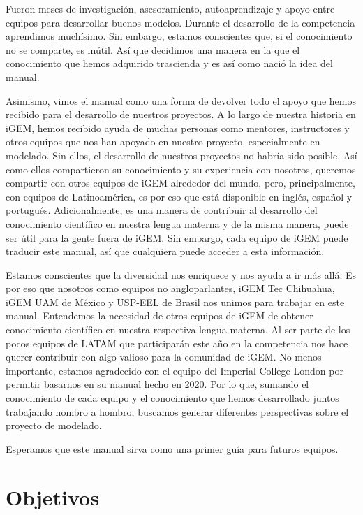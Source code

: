 \documentclass[11pt, letterpaper, spanish]{article}
\begin{document}
\par{Fueron meses de investigación, asesoramiento, autoaprendizaje y apoyo entre equipos para desarrollar buenos modelos. Durante el desarrollo de la competencia aprendimos muchísimo. Sin embargo, estamos conscientes que, si el conocimiento no se comparte, es inútil. Así que decidimos una manera en la que el conocimiento que hemos adquirido trascienda y es así como nació la idea del manual.}
\par{Asimismo, vimos el manual como una forma de devolver todo el apoyo que hemos recibido para el desarrollo de nuestros proyectos. A lo largo de nuestra historia en iGEM, hemos recibido ayuda de muchas personas como mentores, instructores y otros equipos que nos han apoyado en nuestro proyecto, especialmente en modelado. Sin ellos, el desarrollo de nuestros proyectos no habría sido posible. Así como ellos compartieron su conocimiento y su experiencia con nosotros, queremos compartir con otros equipos de iGEM alrededor del mundo, pero, principalmente, con equipos de Latinoamérica, es por eso que está disponible en inglés, español y portugués. Adicionalmente, es una manera de contribuir al desarrollo del conocimiento científico en nuestra lengua materna y de la misma manera, puede ser útil para la gente fuera de iGEM. Sin embargo, cada equipo de iGEM puede traducir este manual, así que cualquiera puede acceder a esta información.}
\par{Estamos conscientes que la diversidad nos enriquece y nos ayuda a ir más allá. Es por eso que nosotros como equipos no angloparlantes, iGEM Tec Chihuahua, iGEM UAM de México y USP-EEL de Brasil nos unimos para trabajar en este manual.  Entendemos la necesidad de otros equipos de iGEM de obtener conocimiento científico en nuestra respectiva lengua materna. Al ser parte de los pocos equipos de LATAM que participarán este año en la competencia nos hace querer contribuir con algo valioso para la comunidad de iGEM.
No menos importante, estamos agradecido con el equipo del Imperial College London por permitir basarnos en su manual hecho en 2020.
Por lo que, sumando el conocimiento de cada equipo y el conocimiento que hemos desarrollado juntos trabajando hombro a hombro, buscamos generar diferentes perspectivas sobre el proyecto de modelado.}
\par{Esperamos que este manual sirva como una primer guía para futuros equipos.}



\section{Objetivos}
\end{document}
